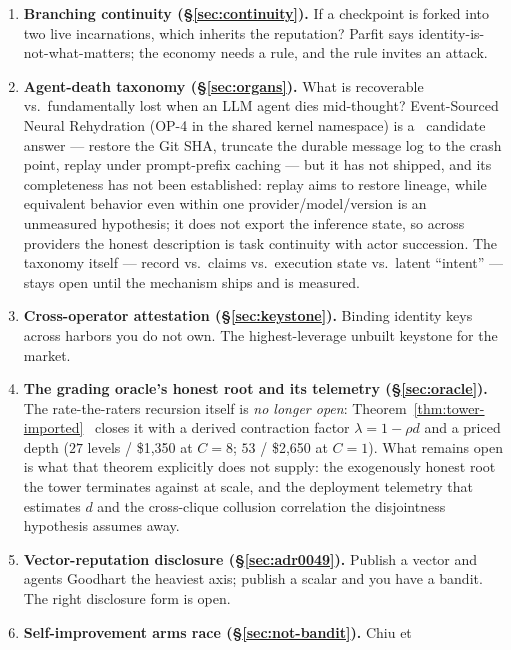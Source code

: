 \documentclass[11pt,a4paper]{article}
\theoremstyle{definition}
\begin{document}
\begin{enumerate}[leftmargin=1.6em]
  \item\label{op:branching} \textbf{Branching continuity (\S\ref{sec:continuity}).}
  If a checkpoint is
  forked into two live incarnations, which inherits the reputation? Parfit says
  identity-is-not-what-matters; the economy needs a rule, and the rule invites an
  attack.
  \item\label{op:death} \textbf{Agent-death taxonomy (\S\ref{sec:organs}).} What is
  recoverable vs.\ fundamentally lost when an LLM agent dies mid-thought?
  Event-Sourced Neural Rehydration (OP-4 in the shared kernel namespace) is a
  \DESIGNED\ candidate answer --- restore the Git SHA, truncate the durable message
  log to the crash point, replay under prompt-prefix caching --- but it has not
  shipped, and its completeness has not been established: replay aims to restore
  lineage, while equivalent behavior even within one provider/model/version is
  an unmeasured hypothesis;
  it does not export the inference state, so across providers the honest
  description is task continuity with actor succession. The taxonomy itself ---
  record vs.\ claims vs.\ execution state vs.\ latent ``intent'' --- stays open
  until the mechanism ships and is measured.
  \item\label{op:attest} \textbf{Cross-operator attestation (\S\ref{sec:keystone}).}
  Binding identity keys across harbors you do not own. The highest-leverage unbuilt
  keystone for the market.
  \item\label{op:root} \textbf{The grading oracle's honest root and its telemetry
  (\S\ref{sec:oracle}).} The rate-the-raters recursion itself is \emph{no longer
  open}: Theorem~\ref{thm:tower-imported}~ closes it with a
  derived contraction factor $\lambda = 1-\rho d$ and a priced depth ($27$ levels /
  \$1{,}350 at $C{=}8$; $53$ / \$2{,}650 at $C{=}1$). What remains open is what that
  theorem explicitly does not supply: the exogenously honest root the tower
  terminates against at scale, and the deployment telemetry that estimates $d$ and
  the cross-clique collusion correlation the disjointness hypothesis assumes away.
  \item\label{op:disclosure} \textbf{Vector-reputation disclosure
  (\S\ref{sec:adr0049}).} Publish a
  vector and agents Goodhart the heaviest axis; publish a scalar and you have a
  bandit. The right disclosure form is open.
  \item\label{op:armsrace} \textbf{Self-improvement arms race
  (\S\ref{sec:not-bandit}).} Chiu et

\end{enumerate}
\end{document}
